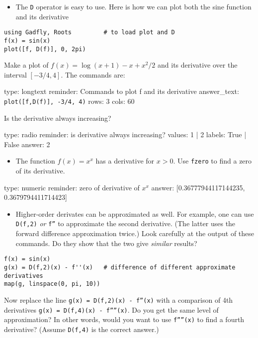 \documentclass[12pt]{article}
\begin{document}
\begin{itemize}
\itemsep1pt\parskip0pt
\item
  The \texttt{D} operator is easy to use. Here is how we can plot both
  the sine function and its derivative
\end{itemize}



\begin{verbatim}
using Gadfly, Roots         # to load plot and D
f(x) = sin(x)
plot([f, D(f)], 0, 2pi)
\end{verbatim}
Make a plot of $f(x) = \log(x+1) - x + x^2/2$ and its derivative over
the interval $[-3/4, 4]$. The commands are:

\begin{answer}
type: longtext
reminder: Commands to plot f and its derivative
answer_text: \verb+plot([f,D(f)], -3/4, 4)+ 
rows: 3
cols: 60
\end{answer}

Is the derivative always increasing?

\begin{answer}
type: radio
reminder: is derivative always increasing?
values: 1 | 2
labels: True | False
answer: 2
\end{answer}

\begin{itemize}
\itemsep1pt\parskip0pt
\item
  The function $f(x) = x^x$ has a derivative for $x > 0$. Use
  \texttt{fzero} to find a zero of its derivative.
\end{itemize}

\begin{answer}
    type: numeric
    reminder: zero of derivative of \( x^x \)
    answer: [0.36777944117144235, 0.3679794411714423]

\end{answer}

\begin{itemize}
\itemsep1pt\parskip0pt
\item
  Higher-order derivates can be approximated as well. For example, one
  can use \texttt{D(f,2)} \emph{or} \texttt{f''} to approximate the
  second derivative. (The latter uses the forward difference
  approximation twice.) Look carefully at the output of these commands.
  Do they show that the two give \emph{similar} results?
\end{itemize}



\begin{verbatim}
f(x) = sin(x)
g(x) = D(f,2)(x) - f''(x)   # difference of different approximate derivatives
map(g, linspace(0, pi, 10))
\end{verbatim}
Now replace the line \texttt{g(x) = D(f,2)(x) - f''(x)} with a
comparison of 4th derivatives \texttt{g(x) = D(f,4)(x) - f''''(x)}. Do
you get the same level of approximation? In other words, would you want
to use \texttt{f''''(x)} to find a fourth derivative? (Assume
\texttt{D(f,4)} is the correct answer.)
\end{document}
